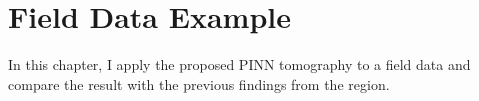 \chapter{Field Data Example}
\label{chap:field_data}

In this chapter, I apply the proposed PINN tomography to a field data and compare the result with the previous findings from the region.